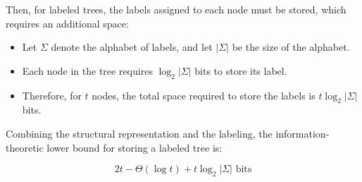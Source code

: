 Then, for labeled trees, the labels assigned to each node must be stored, which requires an additional space:

\begin{itemize}
    \item Let $\Sigma$ denote the alphabet of labels, and let $|\Sigma|$ be the size of the alphabet.
    \item Each node in the tree requires $\log_2 |\Sigma|$ bits to store its label.
    \item Therefore, for $t$ nodes, the total space required to store the labels is $t \log_2 |\Sigma|$ bits.
\end{itemize}

Combining the structural representation and the labeling, the information-theoretic lower bound for storing a labeled tree is:

$$
    2t - \Theta(\log t) + t \log_2 |\Sigma| \text{ bits}
$$